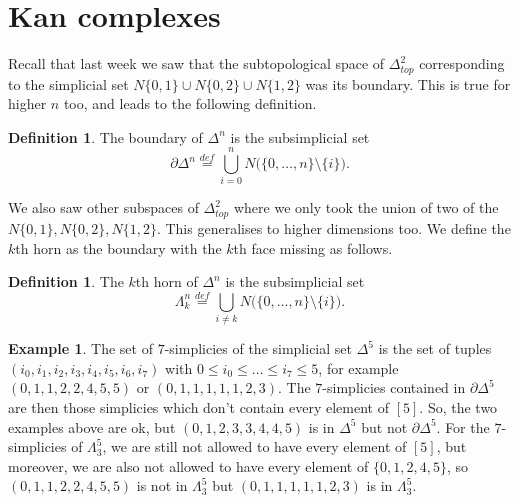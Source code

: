 \documentclass[a4paper]{amsart}
\numberwithin{figure}{section}
\theoremstyle{theorem}
\theoremstyle{definition}
\newtheorem{defi}[thm]{Definition}
\newtheorem{exam}[thm]{Example}
\begin{document}
\section{Kan complexes}

Recall that last week we saw that the subtopological space of $\Delta^2_{top}$ corresponding to the simplicial set $N\{0, 1\} \cup N\{0, 2\} \cup N\{1, 2\}$ was its boundary. This is true for higher $n$ too, and leads to the following definition. \\

\begin{mdframed}
\begin{defi}
The boundary of $\Delta^n$ is the subsimplicial set
\[ \partial \Delta^n \stackrel{def}{=} \bigcup_{i = 0}^n N\biggl ( \{0, \dots, n\} \setminus \{i\} \biggr ). \]
\end{defi}
\end{mdframed}

We also saw other subspaces of $\Delta^2_{top}$ where we only took the union of two of the $N\{0, 1\}, N\{0, 2\}, N\{1, 2\}$. This generalises to higher dimensions too. We define the $k$th horn as the boundary with the $k$th face missing as follows. \\

\begin{mdframed}
\begin{defi}
The $k$th horn of $\Delta^n$ is the subsimplicial set
\[ \Lambda_k^n \stackrel{def}{=} \bigcup_{i \neq k} N\biggl ( \{0, \dots, n\} \setminus \{i\} \biggr ). \]
\end{defi}
\end{mdframed}

\begin{exam}
The set of $7$-simplicies of the simplicial set $\Delta^5$ is the set of tuples $(i_0, i_1, i_2, i_3, i_4, i_5, i_6, i_7)$ with $0 \leq i_0 \leq \dots \leq i_7 \leq 5$, for example $(0, 1, 1, 2, 2, 4, 5, 5)$ or $(0, 1, 1, 1, 1, 1, 2, 3)$. The $7$-simplicies contained in $\partial \Delta^5$ are then those simplicies which don't contain every element of $[5]$. So, the two examples above are ok, but $(0, 1, 2, 3, 3, 4, 4, 5)$ is in $\Delta^5$ but not $\partial \Delta^5$. For the $7$-simplicies of $\Lambda^5_3$, we are still not allowed to have every element of $[5]$, but moreover, we are also not allowed to have every element of $\{0, 1, 2, 4, 5\}$, so $(0, 1, 1, 2, 2, 4, 5, 5)$ is not in $\Lambda^5_3$ but $(0, 1, 1, 1, 1, 1, 2, 3)$ is in $\Lambda^5_3$.
\end{exam}
\end{document}
